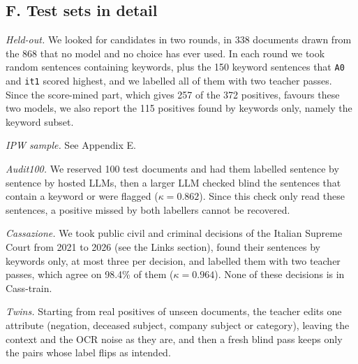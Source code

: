 \documentclass[11pt]{article}
\begin{document}
\subsection*{F. Test sets in detail}
\emph{Held-out.} We looked for candidates in two rounds, in 338 documents drawn from the 868 that no model and no choice has ever used. In each round we took random sentences containing keywords, plus the 150 keyword sentences that \texttt{A0} and \texttt{it1} scored highest, and we labelled all of them with two teacher passes. Since the score-mined part, which gives 257 of the 372 positives, favours these two models, we also report the 115 positives found by keywords only, namely the keyword subset.

\emph{IPW sample.} See Appendix E.

\emph{Audit100.} We reserved 100 test documents and had them labelled sentence by sentence by hosted LLMs, then a larger LLM checked blind the sentences that contain a keyword or were flagged ($\kappa=0.862$). Since this check only read these sentences, a positive missed by both labellers cannot be recovered.

\emph{Cassazione.} We took public civil and criminal decisions of the Italian Supreme Court from 2021 to 2026 (see the Links section), found their sentences by keywords only, at most three per decision, and labelled them with two teacher passes, which agree on 98.4\% of them ($\kappa=0.964$). None of these decisions is in Cass-train.

\emph{Twins.} Starting from real positives of unseen documents, the teacher edits one attribute (negation, deceased subject, company subject or category), leaving the context and the OCR noise as they are, and then a fresh blind pass keeps only the pairs whose label flips as intended.
\end{document}
